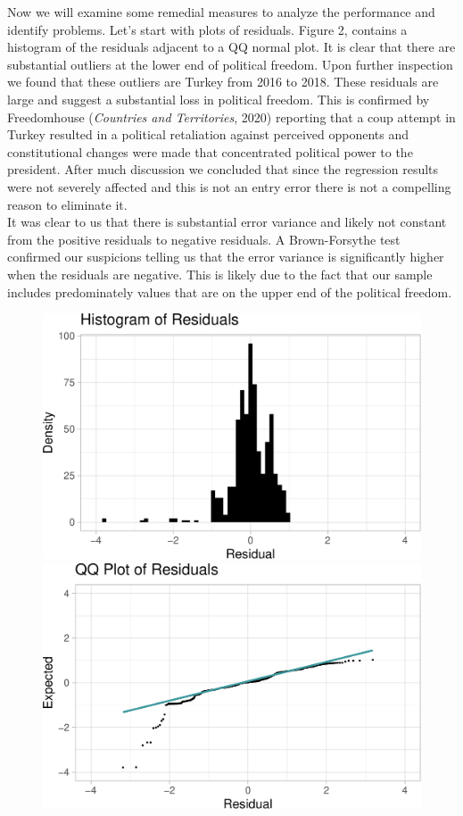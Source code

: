 \documentclass[
  english,
  man,floatsintext]{apa6}
\begin{document}
Now we will examine some remedial measures to analyze the performance and identify problems.
Let's start with plots of residuals. Figure 2, contains a histogram of the residuals adjacent to a QQ normal plot. It is clear that there are substantial outliers at the lower end of political freedom. Upon further inspection we found that these outliers are Turkey from 2016 to 2018. These residuals are large and suggest a substantial loss in political freedom. This is confirmed by Freedomhouse (\emph{Countries and Territories}, 2020) reporting that a coup attempt in Turkey resulted in a political retaliation against perceived opponents and constitutional changes were made that concentrated political power to the president. After much discussion we concluded that since the regression results were not severely affected and this is not an entry error there is not a compelling reason to eliminate it.\\
It was clear to us that there is substantial error variance and likely not constant from the positive residuals to negative residuals. A Brown-Forsythe test confirmed our suspicions telling us that the error variance is significantly higher when the residuals are negative. This is likely due to the fact that our sample includes predominately values that are on the upper end of the political freedom.

\begin{figure}
\includegraphics[width=0.5\linewidth]{paper_files/figure-latex/unnamed-chunk-6-1} \includegraphics[width=0.5\linewidth]{paper_files/figure-latex/unnamed-chunk-6-2} \caption{ }\label{fig:unnamed-chunk-6}
\end{figure}
\end{document}
